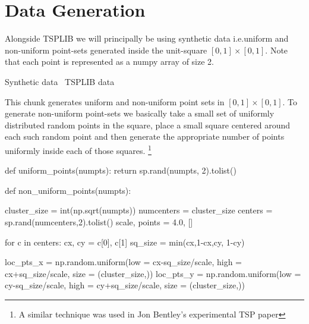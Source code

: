 \nwendcode{}\nwdocspar


\section{Data Generation}

Alongside TSPLIB we will principally be using synthetic data i.e.uniform and non-uniform point-sets generated inside the unit-square $[0,1] \times [0,1]$. 
Note that each point is represented as a numpy array of size 2. 

\nwenddocs{}\endmoddef\nwstartdeflinemarkup{}\nwenddeflinemarkup
\LA{}Synthetic data~{\nwtagstyle{}}\RA{}
\LA{}TSPLIB data~{\nwtagstyle{}}\RA{}
\nwendcode{}\nwdocspar

This chunk generates uniform and non-uniform point sets in $[0,1] \times [0,1]$. To generate non-uniform point-sets we basically 
take a small set of uniformly distributed random points in the square, place a small square centered around each such random point and then
generate the appropriate number of points uniformly inside each of those squares. \footnote{A similar technique was used in Jon Bentley's experimental TSP paper}

\nwenddocs{}\endmoddef\nwstartdeflinemarkup{}\nwenddeflinemarkup
def uniform_points(numpts):
     return  sp.rand(numpts, 2).tolist()

def non_uniform_points(numpts):

    cluster_size = int(np.sqrt(numpts)) 
    numcenters   = cluster_size
    centers      = sp.rand(numcenters,2).tolist()
    scale, points = 4.0, []

    for c in centers:
        cx, cy = c[0], c[1]
        sq_size      = min(cx,1-cx,cy, 1-cy)

        loc_pts_x    = np.random.uniform(low  = cx-sq_size/scale, 
                                         high = cx+sq_size/scale, 
                                         size = (cluster_size,))
        loc_pts_y    = np.random.uniform(low = cy-sq_size/scale, 
                                         high = cy+sq_size/scale, 
                                         size = (cluster_size,))

